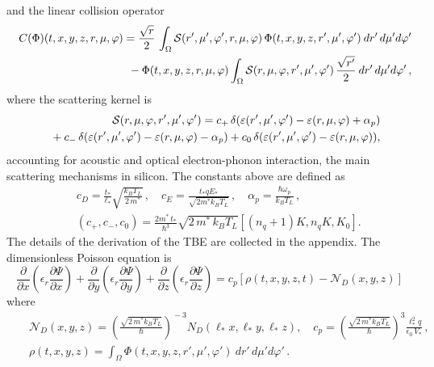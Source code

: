 \documentclass[11pt]{article}
\newcommand{\eps}{\varepsilon}
\newcommand{\nV}{\Psi}
\newcommand{\kbt}{k_B T_L}
\newcommand{\hw}{\hbar \omega_{p}}
\newcommand{\mass}{m^{*}}
\newcommand{\cd}[1]{c_{#1}}
\newcommand{\alp}{\alpha_{p}}
\begin{document}
%
%
and the linear collision operator
%
\begin{eqnarray}
&&
C(\Phi)(t,x,y,z,r,\mu,\varphi) =  \frac{\sqrt{r}}{2}
\, \int_{\Omega} {\cal S}(r', \mu', \varphi', r, \mu, \varphi) \,
\Phi(t,x,y,z,r',\mu',\varphi') \: d r' \, d \mu' d \varphi' 
\nonumber
\\
&&
\mbox{ } \hspace{40pt} - \Phi(t,x,y,z,r,\mu,\varphi)
\int_{\Omega} {\cal S}(r, \mu, \varphi, r', \mu', \varphi') \, \frac{\sqrt{r'}}{2} 
\: d r' \, d \mu' d \varphi' \, ,  
\label{colltrans}
\end{eqnarray}
%
where the scattering kernel is
%
\begin{eqnarray*}
&& {\cal S}(r, \mu, \varphi, r', \mu', \varphi') = \cd{+} \, 
\delta( \eps(r',\mu',\varphi') - \eps(r,\mu,\varphi) + \alp) 
\\
&&
\mbox{} + \cd{-} \, \delta( \eps(r',\mu',\varphi') - \eps(r,\mu,\varphi) - \alp) 
+ \cd{0} \, \delta( \eps(r',\mu',\varphi') - \eps(r,\mu,\varphi) ),
\end{eqnarray*}
%
accounting for acoustic and optical electron-phonon interaction, 
the main scattering mechanisms in silicon. The constants above are defined as
%
\begin{eqnarray*}
&& 
\cd{D} = \frac{t_*}{\ell_*} \sqrt{\frac{\kbt}{2 \, \mass}} \, ,
\quad \cd{E} = \frac{t_* q E_*}{\sqrt{2 \mass \kbt}} \, ,
\quad \alp = \frac{\hw}{\kbt} \, , 
\\
&&
(\cd{+}, \cd{-}, \cd{0}) = \frac{2 \mass \, t_*}{\hbar^3} \sqrt{2 \,
\mass \, \kbt} \left[ (n_{q} + 1) K, n_{q} K, K_0  \right] .
\end{eqnarray*}
The details of the derivation of the TBE are collected in the appendix.
%
The dimensionless Poisson equation is
\begin{equation}
\frac{\partial}{\partial x} \left( \epsilon_{r} \frac{\partial \nV}{\partial x} \right)
+ \frac{\partial}{\partial y} \left( \epsilon_{r} \frac{\partial \nV}{\partial y} \right)
+ \frac{\partial}{\partial z} \left( \epsilon_{r} \frac{\partial \nV}{\partial z} \right)
= \cd{p} \left[ \rho(t,x,y,z,t) - \mathcal{N}_{D}(x,y,z) \right]
\label{poistrans} 
\end{equation}
%
where 
\begin{eqnarray*} 
&&  
\mathcal{N}_{D}(x,y,z) =
\left( \frac{\sqrt{2 \,\mass \kbt }}{\hbar} \right)^{\! \! -3}
N_{D}(\ell_* x, \ell_* y, \ell_* z),
\quad
\cd{p} = \left( \frac{\sqrt{2 \,\mass \kbt }}{\hbar} \right)^{\!\! 3}
\frac{\ell_*^{2} q}{\epsilon_{0} \, V_{*}} \, ,
\\
&& 
\rho(t,x,y,z) =
\int_{\Omega} \Phi(t,x,y,z,r',\mu',\varphi') \: d r' \, d \mu' d \varphi' \, .
\end{eqnarray*}
%
\end{document}
